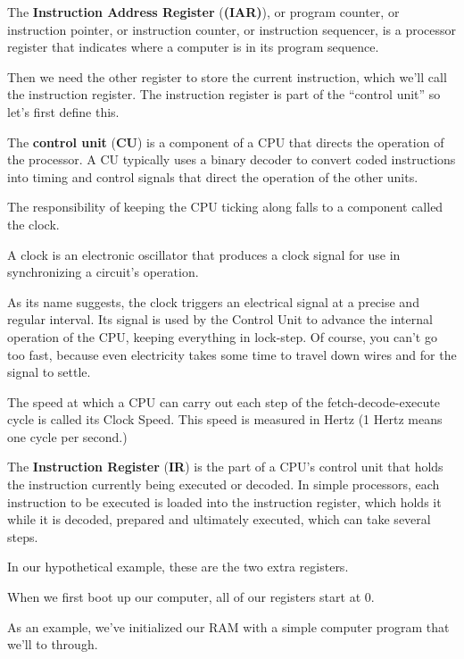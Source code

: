 The \textbf{Instruction Address Register} (\textbf{(IAR)}), or program counter, or instruction pointer, or
instruction counter, or instruction sequencer, is a processor register that indicates where a computer is in its
program sequence.
\ed

Then we need the other register to store the current instruction, which we'll call the instruction register. The
instruction register is part of the ``control unit'' so let's first define this.

The \textbf{control unit} (\textbf{CU}) is a component of a CPU that directs the operation of the processor. A CU
typically uses a binary decoder to convert coded instructions into timing and control signals that direct the
operation of the other units.
\ed

The responsibility of keeping the CPU ticking along falls to a component called the clock.

\bd[Clock]
A clock is an electronic oscillator that produces a clock signal for use in synchronizing a circuit's operation.
\ed

As its name suggests, the clock triggers an electrical signal at a precise and regular interval. Its signal is used
by the Control Unit to advance the internal operation of the CPU, keeping everything in lock-step. Of course, you
can't go too fast, because even electricity takes some time to travel down wires and for the signal to settle.

The speed at which a CPU can carry out each step of the fetch-decode-execute cycle is called its Clock Speed. This
speed is measured in Hertz (1 Hertz means one cycle per second.)
\ed

The \textbf{Instruction Register} (\textbf{IR}) is the part of a CPU's control unit that holds the instruction
currently being executed or decoded. In simple processors, each instruction to be executed is loaded into the
instruction register, which holds it while it is decoded, prepared and ultimately executed, which can take several
steps.
\ed

\be
In our hypothetical example, these are the two extra registers.

\ee

When we first boot up our computer, all of our registers start at 0.

\be
As an example, we've initialized our RAM with a simple computer program that we'll to through.

